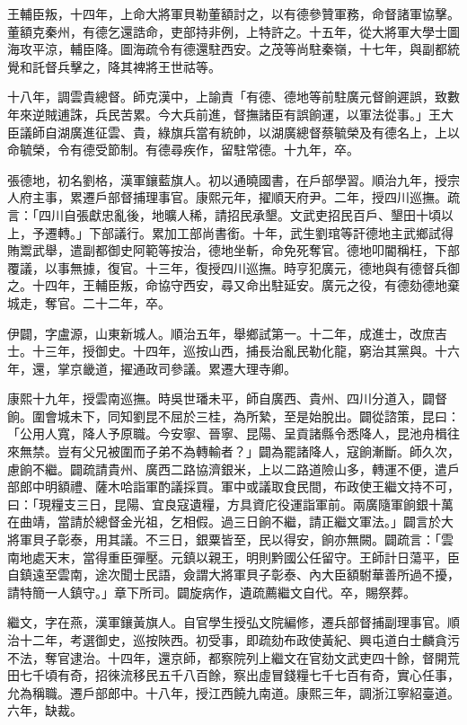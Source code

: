 \begin{pinyinscope}
王輔臣叛，十四年，上命大將軍貝勒董額討之，以有德參贊軍務，命督諸軍協擊。董額克秦州，有德乞還誥命，吏部持非例，上特許之。十五年，從大將軍大學士圖海攻平涼，輔臣降。圖海疏令有德還駐西安。之茂等尚駐秦嶺，十七年，與副都統覺和託督兵擊之，降其裨將王世祜等。

十八年，調雲貴總督。師克漢中，上諭責「有德、德地等前駐廣元督餉遲誤，致數年來逆賊逋誅，兵民苦累。今大兵前進，督撫諸臣有誤餉運，以軍法從事。」王大臣議師自湖廣進征雲、貴，綠旗兵當有統帥，以湖廣總督蔡毓榮及有德名上，上以命毓榮，令有德受節制。有德尋疾作，留駐常德。十九年，卒。

張德地，初名劉格，漢軍鑲藍旗人。初以通曉國書，在戶部學習。順治九年，授宗人府主事，累遷戶部督捕理事官。康熙元年，擢順天府尹。二年，授四川巡撫。疏言：「四川自張獻忠亂後，地曠人稀，請招民承墾。文武吏招民百戶、墾田十頃以上，予遷轉。」下部議行。累加工部尚書銜。十年，武生劉琯等訐德地主武鄉試得賄鬻武舉，遣副都御史阿範等按治，德地坐斬，命免死奪官。德地叩閽稱枉，下部覆議，以事無據，復官。十三年，復授四川巡撫。時亨犯廣元，德地與有德督兵御之。十四年，王輔臣叛，命協守西安，尋又命出駐延安。廣元之役，有德劾德地棄城走，奪官。二十二年，卒。

伊闢，字盧源，山東新城人。順治五年，舉鄉試第一。十二年，成進士，改庶吉士。十三年，授御史。十四年，巡按山西，捕長治亂民勒化龍，窮治其黨與。十六年，還，掌京畿道，擢通政司參議。累遷大理寺卿。

康熙十九年，授雲南巡撫。時吳世璠未平，師自廣西、貴州、四川分道入，闢督餉。圍會城未下，同知劉昆不屈於三桂，為所縶，至是始脫出。闢從諮策，昆曰：「公用人寬，降人予原職。今安寧、晉寧、昆陽、呈貢諸縣令悉降人，昆池舟楫往來無禁。豈有父兄被圍而子弟不為轉輸者？」闢為罷諸降人，寇餉漸斷。師久次，慮餉不繼。闢疏請貴州、廣西二路協濟銀米，上以二路道險山多，轉運不便，遣戶部郎中明額禮、薩木哈詣軍酌議採買。軍中或議取食民間，布政使王繼文持不可，曰：「現糧支三日，昆陽、宜良寇遺糧，方具資庀役運詣軍前。兩廣隨軍餉銀十萬在曲靖，當請於總督金光祖，乞相假。過三日餉不繼，請正繼文軍法。」闢言於大將軍貝子彰泰，用其議。不三日，銀粟皆至，民以得安，餉亦無闕。闢疏言：「雲南地處天末，當得重臣彈壓。元鎮以親王，明則黔國公任留守。王師計日蕩平，臣自鎮遠至雲南，途次聞士民語，僉謂大將軍貝子彰泰、內大臣額駙華善所過不擾，請特簡一人鎮守。」章下所司。闢旋病作，遺疏薦繼文自代。卒，賜祭葬。

繼文，字在燕，漢軍鑲黃旗人。自官學生授弘文院編修，遷兵部督捕副理事官。順治十二年，考選御史，巡按陜西。初受事，即疏劾布政使黃紀、興屯道白士麟貪污不法，奪官逮治。十四年，還京師，都察院列上繼文在官劾文武吏四十餘，督開荒田七千頃有奇，招徠流移民五千八百餘，察出虛冒錢糧七千七百有奇，實心任事，允為稱職。遷戶部郎中。十八年，授江西饒九南道。康熙三年，調浙江寧紹臺道。六年，缺裁。


\end{pinyinscope}
